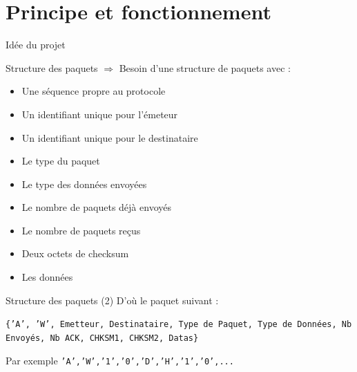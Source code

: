 \documentclass{beamer}
\begin{document}
\section{Principe et fonctionnement}

\begin{frame}{Idée du projet}
    \centering
\end{frame}

\begin{frame}{Structure des paquets}
    $\Longrightarrow$ Besoin d'une structure de paquets avec : 
    \begin{itemize}
        \item {Une séquence propre au protocole}
        \item {Un identifiant unique pour l'émeteur}
        \item {Un identifiant unique pour le destinataire}
        \item {Le type du paquet}
        \item {Le type des données envoyées}
        \item {Le nombre de paquets déjà envoyés}
        \item {Le nombre de paquets reçus}  
        \item {Deux octets de checksum }
        \item {Les données}
    \end{itemize}
\end{frame}


\begin{frame}{Structure des paquets (2)}
    D'où le paquet suivant : 
        \begin{center}
            \texttt{\{'A', 'W', Emetteur, Destinataire, Type de Paquet, Type de Données, Nb Envoyés, Nb ACK, CHKSM1, CHKSM2, Datas\}}
        \end{center}
    Par exemple \texttt{'A','W','1','0','D','H','1','0',... }
\end{frame}
\end{document}
